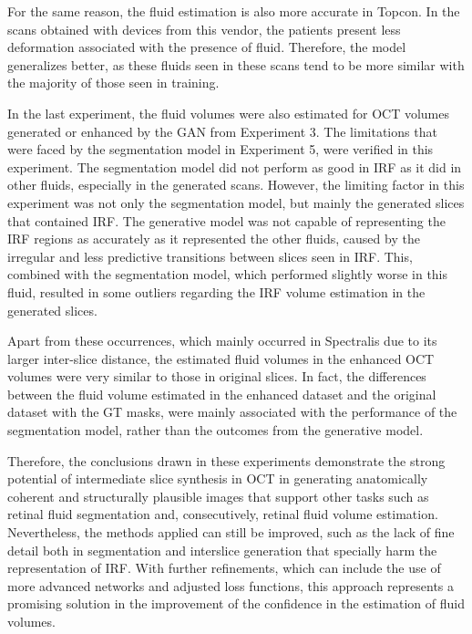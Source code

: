 \par
For the same reason, the fluid estimation is also more accurate in Topcon. In the scans obtained with devices from this vendor, the patients present less deformation associated with the presence of fluid. Therefore, the model generalizes better, as these fluids seen in these scans tend to be more similar with the majority of those seen in training.
\par
In the last experiment, the fluid volumes were also estimated for OCT volumes generated or enhanced by the GAN from Experiment 3. The limitations that were faced by the segmentation model in Experiment 5, were verified in this experiment. The segmentation model did not perform as good in IRF as it did in other fluids, especially in the generated scans. However, the limiting factor in this experiment was not only the segmentation model, but mainly the generated slices that contained IRF. The generative model was not capable of representing the IRF regions as accurately as it represented the other fluids, caused by the irregular and less predictive transitions between slices seen in IRF. This, combined with the segmentation model, which performed slightly worse in this fluid, resulted in some outliers regarding the IRF volume estimation in the generated slices.
\par
Apart from these occurrences, which mainly occurred in Spectralis due to its larger inter-slice distance, the estimated fluid volumes in the enhanced OCT volumes were very similar to those in original slices. In fact, the differences between the fluid volume estimated in the enhanced dataset and the original dataset with the GT masks, were mainly associated with the performance of the segmentation model, rather than the outcomes from the generative model.
\par
Therefore, the conclusions drawn in these experiments demonstrate the strong potential of intermediate slice synthesis in OCT in generating anatomically coherent and structurally plausible images that support other tasks such as retinal fluid segmentation and, consecutively, retinal fluid volume estimation. Nevertheless, the methods applied can still be improved, such as the lack of fine detail both in segmentation and interslice generation that specially harm the representation of IRF. With further refinements, which can include the use of more advanced networks and adjusted loss functions, this approach represents a promising solution in the improvement of the confidence in the estimation of fluid volumes.
\par
